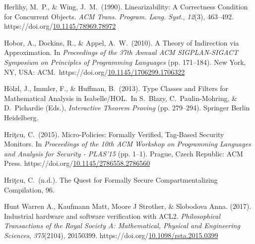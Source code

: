 \documentclass[12pt,twoside]{article}
\begin{document}
{\begin{thebibliography}{222}
Herlihy, M.~P., \& Wing, J.~M.~(1990). Linearizability: A Correctness Condition for Concurrent Objects. \emph{ACM Trans. Program. Lang. Syst.}, \emph{12}(3), 463–492. https://doi.org/\href{https://dx.doi.org/10.1145/78969.78972}{10.1145/78969.78972}\label{herlihy_linearizability:_1990}%

Hobor, A., Dockins, R., \& Appel, A.~W.~(2010). A Theory of Indirection via Approximation. In \emph{Proceedings of the 37th Annual ACM SIGPLAN-SIGACT Symposium on Principles of Programming Languages} (pp. 171–184). New York, NY, USA: ACM.~https://doi.org/\href{https://dx.doi.org/10.1145/1706299.1706322}{10.1145/1706299.1706322}\label{hobor_theory_2010}%

Hölzl, J., Immler, F., \& Huffman, B.~(2013). Type Classes and Filters for Mathematical Analysis in Isabelle/HOL.~In S.~Blazy, C.~Paulin-Mohring, \& D.~Pichardie (Eds.), \emph{Interactive Theorem Proving} (pp. 279–294). Springer Berlin Heidelberg.\label{holzl_type_2013}%

Hriţcu, C.~(2015). Micro-Policies: Formally Verified, Tag-Based Security Monitors. In \emph{Proceedings of the 10th ACM Workshop on Programming Languages and Analysis for Security - PLAS’15} (pp. 1–1). Prague, Czech Republic: ACM Press. https://doi.org/\href{https://dx.doi.org/10.1145/2786558.2786560}{10.1145/2786558.2786560}\label{hritcu_micro-policies:_2015}%

Hriţcu, C.~(n.d.). The Quest for Formally Secure Compartmentalizing Compilation, 96.\label{hritcu_quest_nodate}%

Hunt Warren A., Kaufmann Matt, Moore J Strother, \& Slobodova Anna. (2017). Industrial hardware and software verification with ACL2. \emph{Philosophical Transactions of the Royal Society A: Mathematical, Physical and Engineering Sciences}, \emph{375}(2104), 20150399. https://doi.org/\href{https://dx.doi.org/10.1098/rsta.2015.0399}{10.1098/rsta.2015.0399}\label{hunt_warren_a._industrial_2017}%


\end{thebibliography}}
\end{document}
